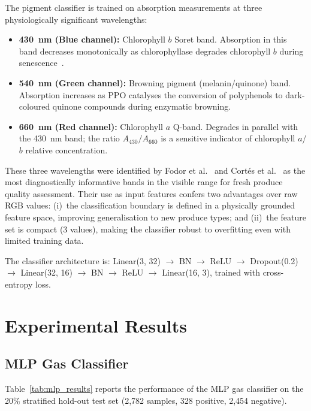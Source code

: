 \documentclass{ieeeaccess}
\begin{document}
The pigment classifier is trained on absorption measurements at three physiologically significant wavelengths:
\begin{itemize}
  \item \textbf{430~nm (Blue channel):} Chlorophyll $b$ Soret band. Absorption in this band decreases monotonically as chlorophyllase degrades chlorophyll $b$ during senescence~\cite{Fodor2024}.
  \item \textbf{540~nm (Green channel):} Browning pigment (melanin/quinone) band. Absorption increases as PPO catalyses the conversion of polyphenols to dark-coloured quinone compounds during enzymatic browning.
  \item \textbf{660~nm (Red channel):} Chlorophyll $a$ Q-band. Degrades in parallel with the 430~nm band; the ratio $A_{430}/A_{660}$ is a sensitive indicator of chlorophyll $a$/$b$ relative concentration.
\end{itemize}

These three wavelengths were identified by Fodor et al.~\cite{Fodor2024} and Cort{\'e}s et al.~\cite{Cortes2019} as the most diagnostically informative bands in the visible range for fresh produce quality assessment. Their use as input features confers two advantages over raw RGB values: (i)~the classification boundary is defined in a physically grounded feature space, improving generalisation to new produce types; and (ii)~the feature set is compact (3 values), making the classifier robust to overfitting even with limited training data.

The classifier architecture is: Linear(3, 32) $\to$ BN $\to$ ReLU $\to$ Dropout(0.2) $\to$ Linear(32, 16) $\to$ BN $\to$ ReLU $\to$ Linear(16, 3), trained with cross-entropy loss.

\section{Experimental Results}
\label{sec:results}

\subsection{MLP Gas Classifier}

Table~\ref{tab:mlp_results} reports the performance of the MLP gas classifier on the 20\% stratified hold-out test set (2,782 samples, 328 positive, 2,454 negative).
\end{document}
